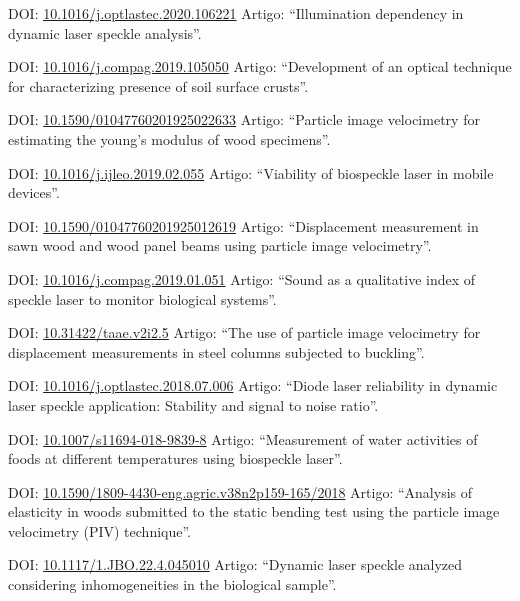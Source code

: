 \documentclass[11pt,a4paper,sans]{moderncv} %
\newcommand{\doiurl}[1]{\href{https://doi.org/#1}{#1}}
\begin{document}
	      {DOI: \doiurl{10.1016/j.optlastec.2020.106221}}{}{}
	      {Artigo: ``Illumination dependency in dynamic laser speckle analysis''.}


	      {DOI: \doiurl{10.1016/j.compag.2019.105050}}{}{}
	      {Artigo: ``Development of an optical technique for characterizing presence of soil surface crusts''.}


	      {DOI: \doiurl{10.1590/01047760201925022633}}{}{}
	      {Artigo: ``Particle image velocimetry for estimating the young’s modulus of wood specimens''.}

	      {DOI: \doiurl{10.1016/j.ijleo.2019.02.055}}{}{}
	      {Artigo: ``Viability of biospeckle laser in mobile devices''.}

	      {DOI: \doiurl{10.1590/01047760201925012619}}{}{}
	      {Artigo: ``Displacement measurement in sawn wood and wood panel beams using particle image velocimetry''.}

	      {DOI: \doiurl{10.1016/j.compag.2019.01.051}}{}{}
	      {Artigo: ``Sound as a qualitative index of speckle laser to monitor biological systems''.}

	      {DOI: \doiurl{10.31422/taae.v2i2.5}}{}{}
	      {Artigo: ``The use of particle image velocimetry for displacement measurements in steel columns subjected to buckling''.}
	      
	      {DOI: \doiurl{10.1016/j.optlastec.2018.07.006}}{}{}
	      {Artigo: ``Diode laser reliability in dynamic laser speckle application: Stability and signal to noise ratio''.}
	      
	      {DOI: \doiurl{10.1007/s11694-018-9839-8}}{}{}
	      {Artigo: ``Measurement of water activities of foods at different temperatures using biospeckle laser''.}

	      {DOI: \doiurl{10.1590/1809-4430-eng.agric.v38n2p159-165/2018}}{}{}
	      {Artigo: ``Analysis of elasticity in woods submitted to the static bending test using the particle image velocimetry (PIV) technique''.}

	      {DOI: \doiurl{10.1117/1.JBO.22.4.045010}}{}{}
	      {Artigo: ``Dynamic laser speckle analyzed considering inhomogeneities in the biological sample''.}
	      
\end{document}
